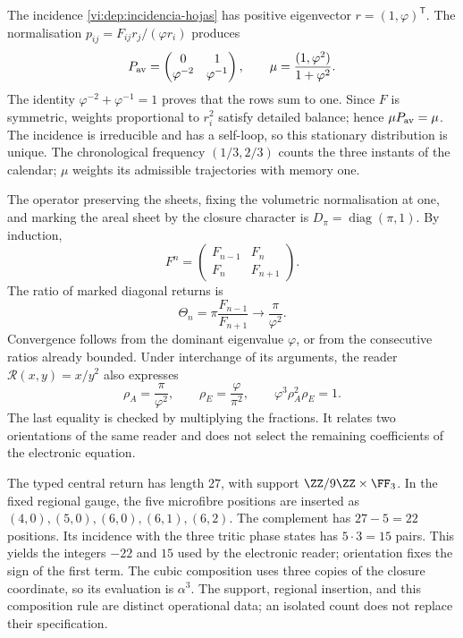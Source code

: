 The incidence \eqref{vi:dep:incidencia-hojas} has positive eigenvector
\(r=(1,\varphi)^{\mathsf T}\). The normalisation
\(p_{ij}=F_{ij}r_j/(\varphi r_i)\) produces
\[
 P_{\rm av}=\begin{pmatrix}0&1\\\varphi^{-2}&\varphi^{-1}\end{pmatrix},
 \qquad \mu=\frac{(1,\varphi^2)}{1+\varphi^2}.
\]
The identity \(\varphi^{-2}+\varphi^{-1}=1\) proves that the rows
sum to one. Since \(F\) is symmetric, weights proportional to
\(r_i^2\) satisfy detailed balance; hence \(\mu P_{\rm av}=\mu\).
The incidence is irreducible and has a self-loop, so
this stationary distribution is unique. The chronological frequency
\((1/3,2/3)\) counts the three instants of the calendar; \(\mu\)
weights its admissible trajectories with memory one.

The operator preserving the sheets, fixing the volumetric normalisation
at one, and marking the areal sheet by the closure character is
\(D_\pi=\operatorname{diag}(\pi,1)\). By induction,
\[
 F^n=\begin{pmatrix}F_{n-1}&F_n\\F_n&F_{n+1}\end{pmatrix}.
\]
The ratio of marked diagonal returns is
\[
 \Theta_n=\pi\frac{F_{n-1}}{F_{n+1}}
 \longrightarrow\frac{\pi}{\varphi^2}.
\]
Convergence follows from the dominant eigenvalue \(\varphi\), or from
the consecutive ratios already bounded. Under interchange of its arguments, the reader
\(\mathcal R(x,y)=x/y^2\)
also expresses
\begin{equation}
 \rho_A=\frac{\pi}{\varphi^2},\qquad
 \rho_E=\frac{\varphi}{\pi^2},\qquad
 \varphi^3\rho_A^2\rho_E=1.
 \label{vi:dep:dos-orientaciones}
\end{equation}
The last equality is checked by multiplying the fractions.
It relates two orientations of the same reader and does not select the
remaining coefficients of the electronic equation.

The typed central return has length \(27\), with support
\(\ZZ/9\ZZ\times\FF_3\). In the fixed regional gauge, the five microfibre
positions are inserted as
\((4,0),(5,0),(6,0),(6,1),(6,2)\).
The complement has \(27-5=22\) positions. Its incidence with the
three tritic phase states has \(5\cdot3=15\) pairs.
This yields the integers \(-22\) and \(15\) used by the
electronic reader; orientation fixes the sign of the first term.
The cubic composition uses three copies of the closure coordinate,
so its evaluation is \(\alpha^3\). The support, regional
insertion, and this composition rule are distinct operational data;
an isolated count does not replace their specification.

